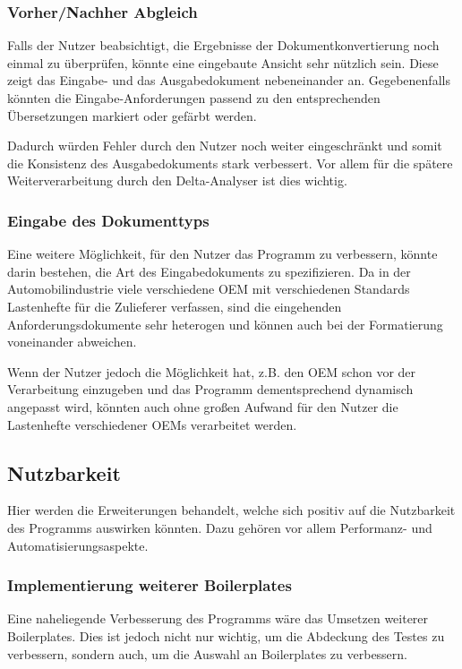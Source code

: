 \documentclass[12pt]{report}
\begin{document}
\subsubsection{Vorher/Nachher Abgleich}
Falls der Nutzer beabsichtigt, die Ergebnisse der Dokumentkonvertierung noch einmal zu überprüfen, könnte eine eingebaute Ansicht sehr nützlich sein. Diese zeigt das Eingabe- und das Ausgabedokument nebeneinander an. Gegebenenfalls könnten die Eingabe-Anforderungen passend zu den entsprechenden Übersetzungen markiert oder gefärbt werden. 

Dadurch würden Fehler durch den Nutzer noch weiter eingeschränkt und somit die Konsistenz des Ausgabedokuments stark verbessert. Vor allem für die spätere Weiterverarbeitung durch den Delta-Analyser ist dies wichtig. 

\subsubsection{Eingabe des Dokumenttyps}
Eine weitere Möglichkeit, für den Nutzer das Programm zu verbessern, könnte darin bestehen, die Art des Eingabedokuments zu spezifizieren. Da in der Automobilindustrie viele verschiedene OEM mit verschiedenen Standards Lastenhefte für die Zulieferer verfassen, sind die eingehenden Anforderungsdokumente sehr heterogen und können auch bei der Formatierung voneinander abweichen. 

Wenn der Nutzer jedoch die Möglichkeit hat, z.B. den OEM schon vor der Verarbeitung einzugeben und das Programm dementsprechend dynamisch angepasst wird, könnten auch ohne großen Aufwand für den Nutzer die Lastenhefte verschiedener OEMs verarbeitet werden. 

\subsection{Nutzbarkeit}
Hier werden die Erweiterungen behandelt, welche sich positiv auf die Nutzbarkeit des Programms auswirken könnten. Dazu gehören vor allem Performanz- und Automatisierungsaspekte.

\subsubsection{Implementierung weiterer Boilerplates}
Eine naheliegende Verbesserung des Programms wäre das Umsetzen weiterer Boilerplates. Dies ist jedoch nicht nur wichtig, um die Abdeckung des Testes zu verbessern, sondern auch, um die Auswahl an Boilerplates zu verbessern. 
\end{document}
